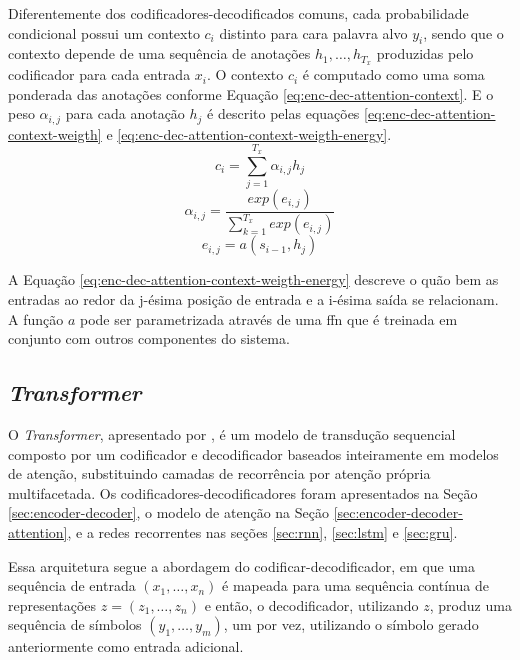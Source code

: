 Diferentemente dos codificadores-decodificados comuns, cada probabilidade condicional possui um contexto $c_i$ distinto para cara palavra alvo $y_i$, sendo que o contexto depende de uma sequência de anotações $h_1, \dots, h_{T_x}$ produzidas pelo codificador para cada entrada $x_i$. O contexto $c_i$ é computado como uma soma ponderada das anotações conforme Equação \ref{eq:enc-dec-attention-context}. E o peso $\alpha_{i,j}$ para cada anotação $h_j$ é descrito pelas equações \ref{eq:enc-dec-attention-context-weigth} e \ref{eq:enc-dec-attention-context-weigth-energy}.
\begin{equation}
    \label{eq:enc-dec-attention-context}
    c_i = \sum_{j = 1}^{T_x} \alpha_{i,j} h_j
\end{equation}
\begin{equation}
    \label{eq:enc-dec-attention-context-weigth}
    \alpha_{i,j} = \frac{exp(e_{i,j})}{\sum_{k=1}^{T_x}exp(e_{i,j})}
\end{equation}
\begin{equation}
    \label{eq:enc-dec-attention-context-weigth-energy}
    e_{i,j} = a(s_{i-1}, h_j)
\end{equation}

A Equação \ref{eq:enc-dec-attention-context-weigth-energy} descreve o quão bem as entradas ao redor da j-ésima posição de entrada e a i-ésima saída se relacionam. A função $a$ pode ser parametrizada através de uma \gls{ffn} que é treinada em conjunto com outros componentes do sistema.

\subsection{\textit{Transformer}}
\label{sec:transformer}

O \textit{Transformer}, apresentado por \textcite{Vaswani2017Attention}, é um modelo de transdução sequencial composto por um codificador e decodificador baseados inteiramente em modelos de atenção, substituindo camadas de recorrência por atenção própria multifacetada. Os codificadores-decodificadores foram apresentados na Seção \ref{sec:encoder-decoder}, o modelo de atenção na Seção \ref{sec:encoder-decoder-attention}, e a redes recorrentes nas seções \ref{sec:rnn}, \ref{sec:lstm} e \ref{sec:gru}.

Essa arquitetura segue a abordagem do codificar-decodificador, em que uma sequência de entrada $(x_1, \dots, x_n)$ é mapeada para uma sequência contínua de representações $z = (z_1, \dots, z_n)$ e então, o decodificador, utilizando $z$, produz uma sequência de símbolos $(y_1, \dots, y_m)$, um por vez, utilizando o símbolo gerado anteriormente como entrada adicional.

